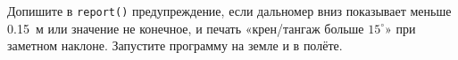 \begin{taskbox}
Допишите в \verb|report()| предупреждение, если дальномер вниз показывает меньше 0.15~м или значение не конечное, и печать «крен/тангаж больше $15^\circ$» при заметном наклоне. Запустите программу на земле и в полёте.
\end{taskbox}
